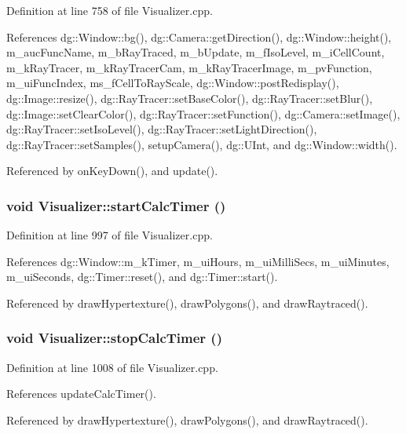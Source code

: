 Definition at line 758 of file Visualizer.cpp.

References dg::Window::bg(), dg::Camera::get\-Direction(), dg::Window::height(), m\_\-auc\-Func\-Name, m\_\-b\-Ray\-Traced, m\_\-b\-Update, m\_\-f\-Iso\-Level, m\_\-i\-Cell\-Count, m\_\-k\-Ray\-Tracer, m\_\-k\-Ray\-Tracer\-Cam, m\_\-k\-Ray\-Tracer\-Image, m\_\-pv\-Function, m\_\-ui\-Func\-Index, ms\_\-f\-Cell\-To\-Ray\-Scale, dg::Window::post\-Redisplay(), dg::Image::resize(), dg::Ray\-Tracer::set\-Base\-Color(), dg::Ray\-Tracer::set\-Blur(), dg::Image::set\-Clear\-Color(), dg::Ray\-Tracer::set\-Function(), dg::Camera::set\-Image(), dg::Ray\-Tracer::set\-Iso\-Level(), dg::Ray\-Tracer::set\-Light\-Direction(), dg::Ray\-Tracer::set\-Samples(), setup\-Camera(), dg::UInt, and dg::Window::width().

Referenced by on\-Key\-Down(), and update().
\subsubsection{\setlength{\rightskip}{0pt plus 5cm}void Visualizer::start\-Calc\-Timer ()\hspace{0.3cm}{\tt  [protected]}}\label{classdg_1_1Visualizer_b8}




Definition at line 997 of file Visualizer.cpp.

References dg::Window::m\_\-k\-Timer, m\_\-ui\-Hours, m\_\-ui\-Milli\-Secs, m\_\-ui\-Minutes, m\_\-ui\-Seconds, dg::Timer::reset(), and dg::Timer::start().

Referenced by draw\-Hypertexture(), draw\-Polygons(), and draw\-Raytraced().
\subsubsection{\setlength{\rightskip}{0pt plus 5cm}void Visualizer::stop\-Calc\-Timer ()\hspace{0.3cm}{\tt  [protected]}}\label{classdg_1_1Visualizer_b10}




Definition at line 1008 of file Visualizer.cpp.

References update\-Calc\-Timer().

Referenced by draw\-Hypertexture(), draw\-Polygons(), and draw\-Raytraced().
